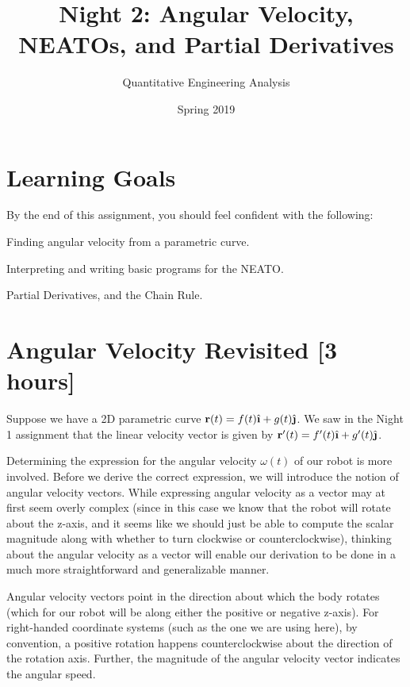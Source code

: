 \documentclass[M3_Night2_Solutions]{subfiles}
\title{Night 2: Angular Velocity, NEATOs, and Partial Derivatives}
\author{Quantitative Engineering Analysis}
\date{Spring 2019}
\begin{document}
\maketitle
\thispagestyle{firstpage}

\section{Learning Goals}
By the end of this assignment, you should feel confident with the following:
\bi
\item Finding angular velocity from a parametric curve.
\item Interpreting and writing basic programs for the NEATO.
\item Partial Derivatives, and the Chain Rule.
\ei

\section{Angular Velocity Revisited [3 hours]}
Suppose we have a 2D parametric curve $\r(t) = f(t) \ihat + g(t) \jhat$. We saw in the Night 1 assignment that the linear velocity vector is given by $\r'(t) = f'(t) \ihat + g'(t) \jhat$.  


Determining the expression for the angular velocity $\omega(t)$ of our robot is more involved.  Before we derive the correct expression, we will introduce the notion of angular velocity vectors.  While expressing angular velocity as a vector may at first seem overly complex (since in this case we know that the robot will rotate about the z-axis, and it seems like we should just be able to compute the scalar magnitude along with whether to turn clockwise or counterclockwise), thinking about the angular velocity as a vector will enable our derivation to be done in a much more straightforward and generalizable manner.

Angular velocity vectors point in the direction about which the body rotates (which for our robot will be along either the positive or negative z-axis).  For right-handed coordinate systems (such as the one we are using here), by convention, a positive rotation happens counterclockwise about the direction of the rotation axis.  Further, the magnitude of the angular velocity vector indicates the angular speed.
\end{document}
